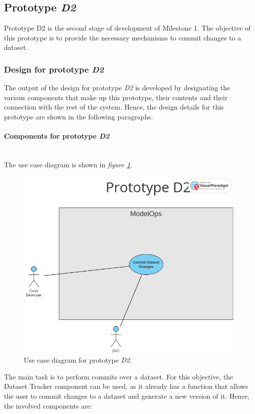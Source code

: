 \subsection{Prototype \emph{D2}}

Prototype D2 is the second stage of development of Milestone 1. The objective of this prototype is to provide the necessary mechanisms to commit changes to a dataset.

\subsubsection{Design for prototype \emph{D2}}

The output of the design for prototype \emph{D2} is developed by designating the various components that make up this prototype, their contents and their connection with the rest of the system.
Hence, the design details for this prototype are shown in the following paragraphs.

\paragraph{Components for prototype \emph{D2}} \mbox{}\\

The use case diagram is shown in \emph{figure \ref{fig:useCaseD2}}.

\begin{figure}[H]
    \centering
    \includegraphics[width=0.7\linewidth]{figs/use-case-D2.png}
    \caption{Use case diagram for prototype \emph{D2}.}
    \label{fig:useCaseD2}
\end{figure}

The main task is to perform commits over a dataset. For this objective, the Dataset Tracker component can be used, as it already has a function that allows the user to 
commit changes to a dataset and generate a new version of it. Hence, the involved components are:

